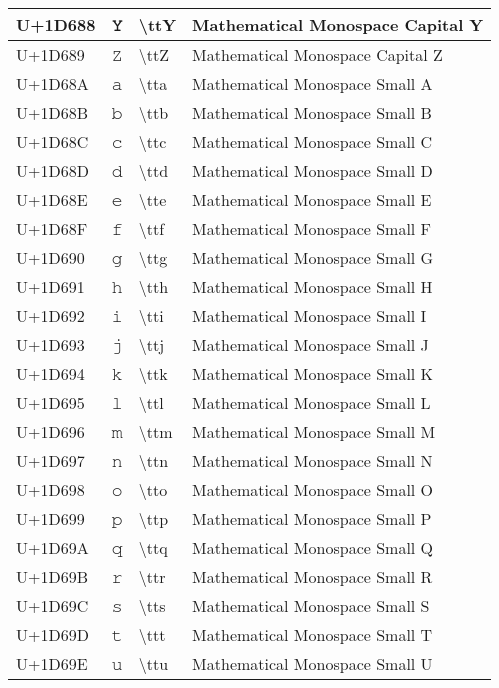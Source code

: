 \begin{table}[h]
\begin{tabulary}{\linewidth}{|L|L|L|L|}
\hline
U+1D688 & 𝚈 & {\textbackslash}ttY & Mathematical Monospace Capital Y \\
\hline
U+1D689 & 𝚉 & {\textbackslash}ttZ & Mathematical Monospace Capital Z \\
\hline
U+1D68A & 𝚊 & {\textbackslash}tta & Mathematical Monospace Small A \\
\hline
U+1D68B & 𝚋 & {\textbackslash}ttb & Mathematical Monospace Small B \\
\hline
U+1D68C & 𝚌 & {\textbackslash}ttc & Mathematical Monospace Small C \\
\hline
U+1D68D & 𝚍 & {\textbackslash}ttd & Mathematical Monospace Small D \\
\hline
U+1D68E & 𝚎 & {\textbackslash}tte & Mathematical Monospace Small E \\
\hline
U+1D68F & 𝚏 & {\textbackslash}ttf & Mathematical Monospace Small F \\
\hline
U+1D690 & 𝚐 & {\textbackslash}ttg & Mathematical Monospace Small G \\
\hline
U+1D691 & 𝚑 & {\textbackslash}tth & Mathematical Monospace Small H \\
\hline
U+1D692 & 𝚒 & {\textbackslash}tti & Mathematical Monospace Small I \\
\hline
U+1D693 & 𝚓 & {\textbackslash}ttj & Mathematical Monospace Small J \\
\hline
U+1D694 & 𝚔 & {\textbackslash}ttk & Mathematical Monospace Small K \\
\hline
U+1D695 & 𝚕 & {\textbackslash}ttl & Mathematical Monospace Small L \\
\hline
U+1D696 & 𝚖 & {\textbackslash}ttm & Mathematical Monospace Small M \\
\hline
U+1D697 & 𝚗 & {\textbackslash}ttn & Mathematical Monospace Small N \\
\hline
U+1D698 & 𝚘 & {\textbackslash}tto & Mathematical Monospace Small O \\
\hline
U+1D699 & 𝚙 & {\textbackslash}ttp & Mathematical Monospace Small P \\
\hline
U+1D69A & 𝚚 & {\textbackslash}ttq & Mathematical Monospace Small Q \\
\hline
U+1D69B & 𝚛 & {\textbackslash}ttr & Mathematical Monospace Small R \\
\hline
U+1D69C & 𝚜 & {\textbackslash}tts & Mathematical Monospace Small S \\
\hline
U+1D69D & 𝚝 & {\textbackslash}ttt & Mathematical Monospace Small T \\
\hline
U+1D69E & 𝚞 & {\textbackslash}ttu & Mathematical Monospace Small U \\

\end{tabulary}
\end{table}
